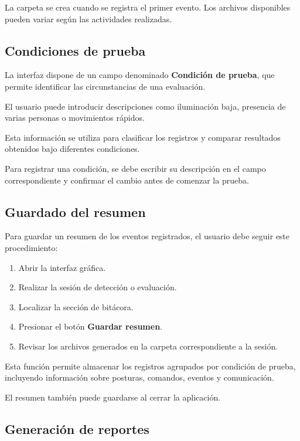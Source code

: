 \documentclass[letterpaper,journal]{IEEEtran}
\begin{document}
La carpeta se crea cuando se registra
el primer evento. Los archivos
disponibles pueden variar según
las actividades realizadas.

\subsection{Condiciones de prueba}

La interfaz dispone de un campo
denominado \textbf{Condición de prueba},
que permite identificar las
circunstancias de una evaluación.

El usuario puede introducir
descripciones como iluminación baja,
presencia de varias personas
o movimientos rápidos.

Esta información se utiliza para
clasificar los registros y comparar
resultados obtenidos bajo diferentes
condiciones.

Para registrar una condición,
se debe escribir su descripción
en el campo correspondiente
y confirmar el cambio antes
de comenzar la prueba.

\subsection{Guardado del resumen}

Para guardar un resumen de los
eventos registrados, el usuario
debe seguir este procedimiento:

\begin{enumerate}
    \item Abrir la interfaz gráfica.
    \item Realizar la sesión de
    detección o evaluación.
    \item Localizar la sección
    de bitácora.
    \item Presionar el botón
    \textbf{Guardar resumen}.
    \item Revisar los archivos
    generados en la carpeta
    correspondiente a la sesión.
\end{enumerate}

Esta función permite almacenar
los registros agrupados por
condición de prueba, incluyendo
información sobre posturas,
comandos, eventos y comunicación.

El resumen también puede
guardarse al cerrar la aplicación.

\subsection{Generación de reportes}
\end{document}
